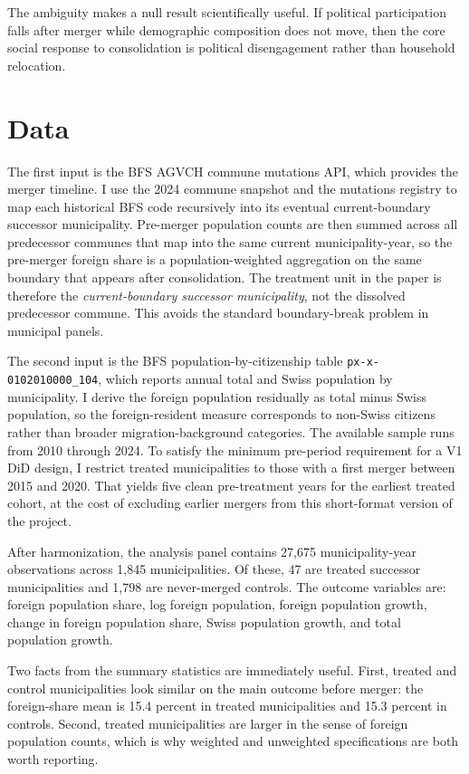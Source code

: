 \documentclass[12pt]{article}
\begin{document}
The ambiguity makes a null result scientifically useful. If political participation falls after merger while demographic composition does not move, then the core social response to consolidation is political disengagement rather than household relocation.

\section{Data}

The first input is the BFS AGVCH commune mutations API, which provides the merger timeline. I use the 2024 commune snapshot and the mutations registry to map each historical BFS code recursively into its eventual current-boundary successor municipality. Pre-merger population counts are then summed across all predecessor communes that map into the same current municipality-year, so the pre-merger foreign share is a population-weighted aggregation on the same boundary that appears after consolidation. The treatment unit in the paper is therefore the \emph{current-boundary successor municipality}, not the dissolved predecessor commune. This avoids the standard boundary-break problem in municipal panels.

The second input is the BFS population-by-citizenship table \texttt{px-x-0102010000\_104}, which reports annual total and Swiss population by municipality. I derive the foreign population residually as total minus Swiss population, so the foreign-resident measure corresponds to non-Swiss citizens rather than broader migration-background categories. The available sample runs from 2010 through 2024. To satisfy the minimum pre-period requirement for a V1 DiD design, I restrict treated municipalities to those with a first merger between 2015 and 2020. That yields five clean pre-treatment years for the earliest treated cohort, at the cost of excluding earlier mergers from this short-format version of the project.

After harmonization, the analysis panel contains 27,675 municipality-year observations across 1,845 municipalities. Of these, 47 are treated successor municipalities and 1,798 are never-merged controls. The outcome variables are: foreign population share, log foreign population, foreign population growth, change in foreign population share, Swiss population growth, and total population growth.



Two facts from the summary statistics are immediately useful. First, treated and control municipalities look similar on the main outcome before merger: the foreign-share mean is 15.4 percent in treated municipalities and 15.3 percent in controls. Second, treated municipalities are larger in the sense of foreign population counts, which is why weighted and unweighted specifications are both worth reporting.
\end{document}
